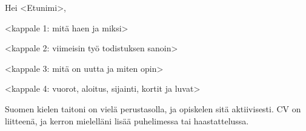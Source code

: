 \documentclass[a4paper,11pt]{article}
\begin{document}


\subject{Hakemus: <Työnimike>, <Yritys> <Kaupunki>}

Hei <Etunimi>,

<kappale 1: mitä haen ja miksi>

<kappale 2: viimeisin työ todistuksen sanoin>

<kappale 3: mitä on uutta ja miten opin>

<kappale 4: vuorot, aloitus, sijainti, kortit ja luvat>

Suomen kielen taitoni on vielä perustasolla, ja opiskelen sitä aktiivisesti. CV on liitteenä, ja kerron mielelläni lisää puhelimessa tai haastattelussa.

\end{document}
